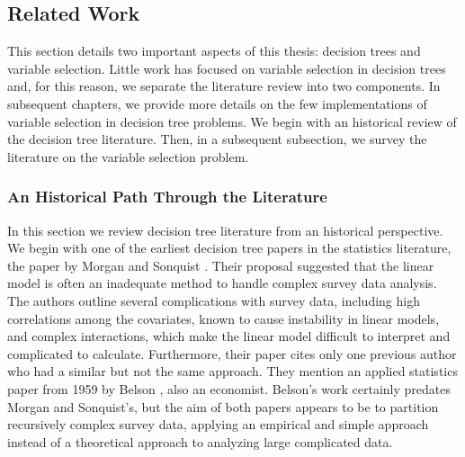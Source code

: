 \subsection{Related Work}
\label{ch:related}


This section details two important aspects of this thesis: decision trees and variable selection. Little work has focused on variable selection in decision trees and, for this reason, we separate the literature review into two components. In subsequent chapters, we provide more details on the few implementations of variable selection in decision tree problems. We begin with an historical review of the decision tree literature. Then, in a subsequent subsection, we survey the literature on the variable selection problem. 

\subsubsection{An Historical Path Through the Literature}

In this section we review decision tree literature from an historical perspective. We begin with one of the earliest decision tree papers in the statistics literature, the paper by Morgan and Sonquist \cite{morgan1963problems}. Their proposal suggested that the linear model is often an inadequate method to handle complex survey data analysis. The authors outline several complications with survey data, including high correlations among the covariates, known to cause instability in linear models, and complex interactions, which make the linear model difficult to interpret and complicated to calculate. Furthermore, their paper cites only one previous author who had a similar but not the same approach. They mention an applied statistics paper from 1959 by Belson \cite{belson1959matching}, also an economist. Belson's work certainly predates Morgan and Sonquist's, but the aim of both papers appears to be to partition recursively complex survey data, applying an empirical and simple approach instead of a theoretical approach to analyzing large complicated data. 

